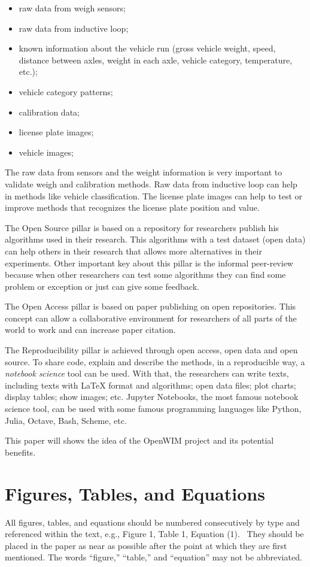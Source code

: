 \documentclass[a4paper]{article}
\begin{document}
{\begin{itemize}
\item raw data from weigh sensors;
\item raw data from inductive loop;
\item known information about the vehicle run (gross vehicle weight, speed, distance between axles, weight in each axle, vehicle category, temperature, etc.);
\item vehicle category patterns;
\item calibration data;
\item license plate images;
\item vehicle images;
\end{itemize}

The raw data from sensors and the weight information is very important to validate weigh and calibration methods. Raw data from inductive loop can help in methods like vehicle classification. The license plate images can help to test or improve methods that recognizes the license plate position and value.

The Open Source pillar is based on a repository for researchers publish his algorithms used in their research. This algorithms with a test dataset (open data) can help others in their research that allows more alternatives in their experiments. Other important key about this pillar is the informal peer-review because when other researchers can test some algorithms they can find some problem or exception or just can give some feedback.

The Open Access pillar is based on paper publishing on open repositories. This concept can allow a collaborative environment for researchers of all parts of the world to work and can increase paper citation.

The Reproducibility pillar is achieved through open access, open data and open source. To share code, explain and describe the methods, in a reproducible way, a \textit{notebook science} tool can be used. With that, the researchers can write texts, including texts with LaTeX format and algorithms; open data files; plot charts; display tables; show images; etc. Jupyter Notebooks, the most famous notebook science tool, can be used with some famous programming languages like Python, Julia, Octave, Bash, Scheme, etc.

This paper will shows the idea of the OpenWIM project and its potential benefits.

\iffalse

\section{Figures, Tables, and Equations}
{
All figures, tables, and equations should be numbered consecutively by
type and referenced within the text, e.g., Figure 1, Table 1, Equation
(1). \ They should be placed in the paper as near as possible after the
point at which they are first mentioned. The words “figure,” “table,”
and “equation” may not be abbreviated.}

}
\end{document}
